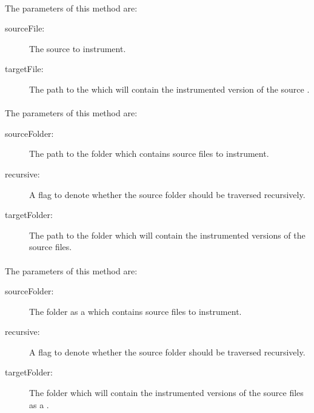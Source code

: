 \paragraph{} \label{Classes:Instrumentation:Instrumenter:instrument_file}
The parameters of this method are:
\begin{description}
\item[sourceFile:] The source  to instrument.
\item[targetFile:] The path to the  which will contain the instrumented version of the source .
\end{description}
\paragraph{} \label{Classes:Instrumentation:Instrumenter:instrumentFolder}
The parameters of this method are:
\begin{description}
\item[sourceFolder:] The path to the folder which contains source files to instrument.
\item[recursive:] A flag to denote whether the source folder should be traversed recursively.
\item[targetFolder:] The path to the folder which will contain the instrumented versions of the source files.
\end{description}
\paragraph{} \label{Classes:Instrumentation:Instrumenter:instrumentFolder_file}
The parameters of this method are:
\begin{description}
\item[sourceFolder:] The folder as a  which contains source files to instrument.
\item[recursive:] A flag to denote whether the source folder should be traversed recursively.
\item[targetFolder:] The folder which will contain the instrumented versions of the source files as a .
\end{description}
